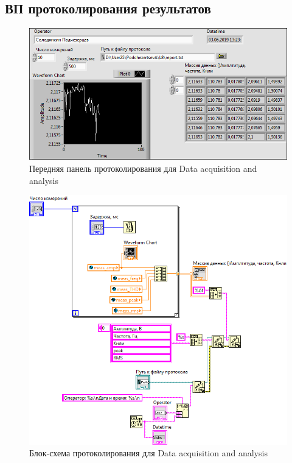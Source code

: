 \documentclass[a4paper,14pt]{article}
\begin{document}
\subsection{ВП протоколирования результатов}

\begin{figure}[H]
	\centering
	\includegraphics[width=\linewidth]{image/daa_scaner_vi}
	\caption{Передняя панель протоколирования для Data acquisition and analysis}\label{img:daa_scaner_vi}
\end{figure}

\begin{figure}[H]
	\centering
	\includegraphics[width=\linewidth]{image/daa_scaner_schema}
	\caption{Блок-схема протоколирования для Data acquisition and analysis}\label{img:daa_scaner_schema}
\end{figure}
\end{document}
